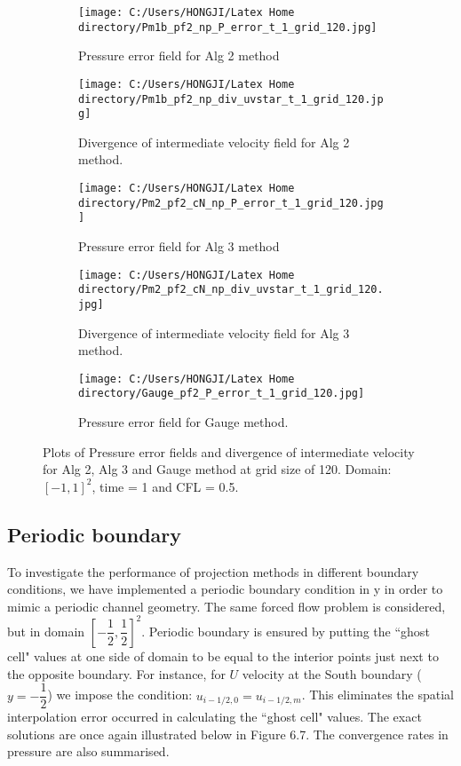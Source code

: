 \begin{figure}[H]
	\centering
	\begin{subfigure}[t]{2.2in}
		\centering
		\texttt{[image: C:/Users/HONGJI/Latex Home directory/Pm1b\_pf2\_np\_P\_error\_t\_1\_grid\_120.jpg]}
		\caption{Pressure error field for Alg 2 method}\label{fig:6.19a}		
	\end{subfigure}
	\quad
	\begin{subfigure}[t]{2.8in}
		\centering
		\texttt{[image: C:/Users/HONGJI/Latex Home directory/Pm1b\_pf2\_np\_div\_uvstar\_t\_1\_grid\_120.jpg]}
		\caption{Divergence of intermediate velocity field for Alg 2 method. }\label{fig:6.19b}
	\end{subfigure}
	\quad
	\centering
	\begin{subfigure}[t]{2.2in}
		\centering
		\texttt{[image: C:/Users/HONGJI/Latex Home directory/Pm2\_pf2\_cN\_np\_P\_error\_t\_1\_grid\_120.jpg]}
		\caption{Pressure error field for Alg 3 method}\label{fig:6.19c}		
	\end{subfigure}
	\quad
	\begin{subfigure}[t]{2.6in}
		\centering
		\texttt{[image: C:/Users/HONGJI/Latex Home directory/Pm2\_pf2\_cN\_np\_div\_uvstar\_t\_1\_grid\_120.jpg]}
		\caption{Divergence of intermediate velocity field for Alg 3 method.}\label{fig:6.19d}
	\end{subfigure}
	\quad
	\begin{subfigure}[t]{2.5in}
		\centering
		\texttt{[image: C:/Users/HONGJI/Latex Home directory/Gauge\_pf2\_P\_error\_t\_1\_grid\_120.jpg]}
		\caption{Pressure error field for Gauge method. }\label{fig:6.19d}
	\end{subfigure}
	\caption{Plots of Pressure error fields and divergence of intermediate velocity for Alg 2, Alg 3 and Gauge method at grid size of 120. Domain: $[-1,1]^2$, time = 1 and CFL = 0.5. }\label{fig:6.16}
\end{figure}

\subsection*{Periodic boundary}
To investigate the performance of projection methods in different boundary conditions, we have implemented a periodic boundary condition in y in order to mimic a periodic channel geometry. The same forced flow problem is considered, but in domain $[-\dfrac{1}{2},\dfrac{1}{2}]^2$. Periodic boundary is ensured by putting the ``ghost cell" values at one side of domain to be equal to the interior points just next to the opposite boundary. For instance, for $U$ velocity at the South boundary ($y = -\dfrac{1}{2}$) we impose the condition: $u_{i-1/2,0} = u_{i-1/2,m}$. This eliminates the spatial interpolation error occurred in calculating the ``ghost cell" values. The exact solutions are once again illustrated below in Figure 6.7. The convergence rates in pressure are also summarised.\\

